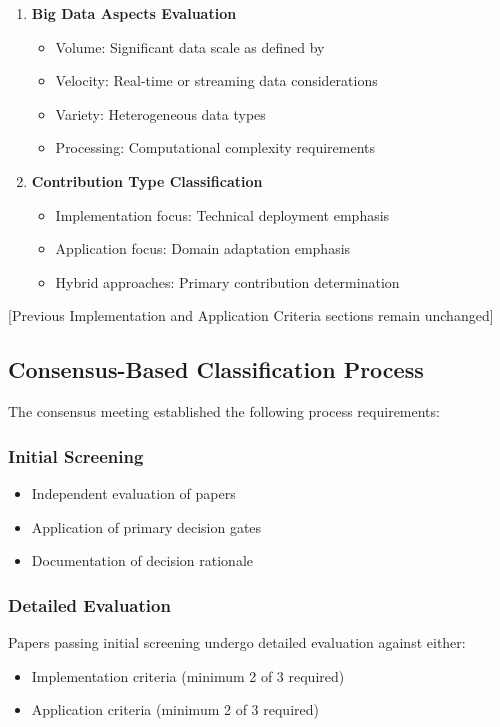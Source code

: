 \documentclass[a4paper,12pt]{article}
\begin{document}
\begin{enumerate}
\begin{enumerate}
    \item \textbf{Big Data Aspects Evaluation}
    \begin{itemize}
        \item Volume: Significant data scale as defined by \citet{laney2001data}
        \item Velocity: Real-time or streaming data considerations
        \item Variety: Heterogeneous data types
        \item Processing: Computational complexity requirements
    \end{itemize}

    \item \textbf{Contribution Type Classification}
    \begin{itemize}
        \item Implementation focus: Technical deployment emphasis
        \item Application focus: Domain adaptation emphasis
        \item Hybrid approaches: Primary contribution determination
    \end{itemize}
\end{enumerate}

[Previous Implementation and Application Criteria sections remain unchanged]

\subsection{Consensus-Based Classification Process}
The consensus meeting established the following process requirements:

\subsubsection{Initial Screening}
\begin{itemize}
    \item Independent evaluation of papers
    \item Application of primary decision gates
    \item Documentation of decision rationale
\end{itemize}

\subsubsection{Detailed Evaluation}
Papers passing initial screening undergo detailed evaluation against either:
\begin{itemize}
    \item Implementation criteria (minimum 2 of 3 required)
    \item Application criteria (minimum 2 of 3 required)
\end{itemize}


\end{enumerate}
\end{document}

